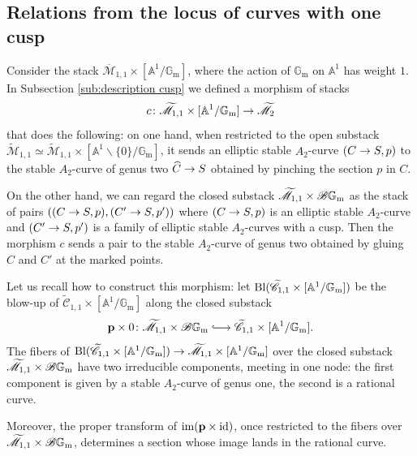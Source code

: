 \documentclass[a4paper, 10pt]{amsart}
\numberwithin{equation}{section}
\numberwithin{subsection}{section}
\theoremstyle{definition}
\theoremstyle{remark}
\renewcommand{\mathcal}{\mathscr}
\newcommand\cM{\mathcal{M}} \newcommand\cN{\mathcal{N}}
\renewcommand\AA{\mathbb{A}} \newcommand\BB{\mathbb{B}}
\newcommand\GG{\mathbb{G}} \newcommand\HH{\mathbb{H}}
\newcommand\rmm{\mathrm{m}} \newcommand\rmn{\mathrm{n}}
\newcommand\arr{\ifinner\to\else\longrightarrow\fi}
\newcommand{\hooklongrightarrow}{\lhook\joinrel\longrightarrow}
\newcommand\im[1]{\operatorname{im}(#1)}
\newcommand{\gm}{\GG_{\rmm}}
\newcommand{\Mbar}{\overline{\cM}}
\newcommand{\Mtilde}{\widetilde{\mathcal M}}
\newcommand{\Ctilde}{\widetilde{\mathcal C}}
\begin{document}
	\subsection{Relations from the locus of curves with one cusp}
	Consider the stack $\Mbar_{1,1}\times [\AA^1/\gm]$, where the action of $\gm$ on $\AA^1$ has weight $1$. In Subsection \ref{sub:description cusp} we defined a morphism of stacks
	\[ c\colon\Mtilde_{1,1}\times [\AA^1/\gm] \arr \Mtilde_2 \]
	that does the following: on one hand, when restricted to the open substack $\Mtilde_{1,1}\simeq\Mtilde_{1,1}\times [\AA^1\smallsetminus\{0\}/\gm]$, it sends an elliptic stable $A_2$-curve $(C\arr S,p)$ to the stable $A_2$-curve of genus two $\widehat{C}\arr S$ obtained by pinching the section $p$ in $C$. 
	
	On the other hand, we can regard the closed substack $\Mtilde_{1,1}\times \cB\gm$ as the stack of pairs $((C\arr S,p),(C'\arr S,p'))$ where $(C\arr S,p)$ is an elliptic stable $A_2$-curve and $(C'\arr S,p')$ is a family of elliptic stable $A_2$-curves with a cusp. Then the morphism $c$ sends a pair to the stable $A_2$-curve of genus two obtained by gluing $C$ and $C'$ at the marked points.
	
	Let us recall how to construct this morphism: let $\rm{Bl}(\Ctilde_{1,1}\times [\AA^1/\gm])$ be the blow-up of $\Ctilde_{1,1}\times [\AA^1/\gm]$ along the closed substack
	\[ \bfp\times 0\colon\Mtilde_{1,1}\times\cB\gm \hooklongrightarrow \Ctilde_{1,1}\times [\AA^1/\gm]. \]
	The fibers of $\rm{Bl}(\Ctilde_{1,1}\times [\AA^1/\gm])\arr \Mtilde_{1,1}\times [\AA^1/\gm]$ over the closed substack $\Mtilde_{1,1}\times\cB\gm$ have two irreducible components, meeting in one node: the first component is given by a stable $A_2$-curve of genus one, the second is a rational curve.
	
	Moreover, the proper transform of $\im{\bfp\times\rm{id}}$, once restricted to the fibers over $\Mtilde_{1,1}\times\cB\gm$, determines a section whose image lands in the rational curve.
	
\end{document}
